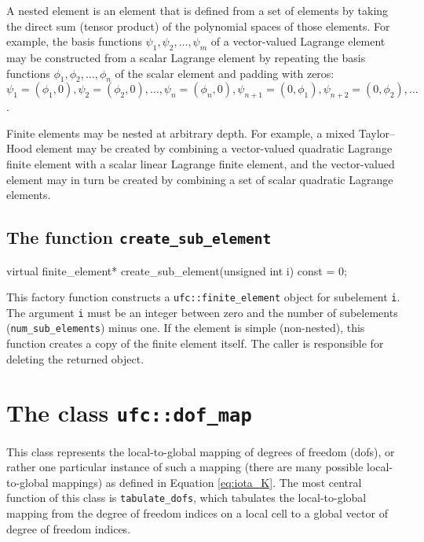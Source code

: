 A nested element is an element that is defined from a set of elements
by taking the direct sum (tensor product) of the polynomial spaces of
those elements. For example, the basis functions $\psi_1, \psi_2,
\ldots, \psi_m$ of a vector-valued Lagrange element may be constructed
from a scalar Lagrange element by repeating the basis functions
$\phi_1, \phi_2, \ldots, \phi_n$ of the scalar element and padding
with zeros: $\psi_1 = (\phi_1, 0), \psi_2 = (\phi_2, 0), \ldots,
\psi_n = (\phi_n, 0), \psi_{n+1} = (0, \phi_1), \psi_{n+2} = (0,
\phi_2), \ldots$.

Finite elements may be nested at arbitrary depth. For example, a mixed
Taylor--Hood element may be created by combining a vector-valued
quadratic Lagrange finite element with a scalar linear Lagrange finite
element, and the vector-valued element may in turn be created by
combining a set of scalar quadratic Lagrange elements.

\subsection{The function \texttt{create\_sub\_element}}

\begin{code}
virtual finite_element*
create_sub_element(unsigned int i) const = 0;
\end{code}

This factory function constructs a \texttt{ufc::finite\_element}
object for subelement \texttt{i}. The argument \texttt{i} must be an
integer between zero and the number of subelements
(\texttt{num\_sub\_elements}) minus one. If the element is simple
(non-nested), this function creates a copy of the finite element
itself. The caller is responsible for deleting the returned object.

\section{The class \texttt{ufc::dof\_map}}

This class represents the local-to-global mapping of degrees of
freedom (dofs), or rather one particular instance of such a mapping
(there are many possible local-to-global mappings) as defined in
Equation \eqref{eq:iota_K}. The most central function of this class is
\texttt{tabulate\_dofs}, which tabulates the local-to-global mapping
from the degree of freedom indices on a local cell to a global vector of
degree of freedom indices.

